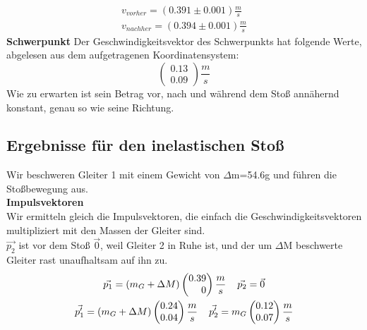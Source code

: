 \documentclass{article}
\begin{document}
\begin{gather*}
v_{vorher}=(0.391 \pm 0.001) \frac{m}{s} \\
v_{nachher}=( 0.394 \pm 0.001) \frac{m}{s}
\end{gather*}
\textbf{Schwerpunkt}
Der Geschwindigkeitsvektor des Schwerpunkts hat folgende Werte, abgelesen aus dem aufgetragenen Koordinatensystem: 
\begin{equation}
\begin{pmatrix*}
0.13 \\ 0.09 
\end{pmatrix*}\frac{m}{s} 
\end{equation}
Wie zu erwarten ist sein Betrag vor, nach und während dem Stoß annähernd konstant, genau so wie seine Richtung.
\subsection{Ergebnisse für den inelastischen Stoß}
Wir beschweren Gleiter 1 mit einem Gewicht von $\Delta$m=54.6g und führen die Stoßbewegung aus. \\
\textbf{Impulsvektoren}\\
Wir ermitteln gleich die Impulsvektoren, die einfach die Geschwindigkeitsvektoren multipliziert mit den Massen der Gleiter sind. \\
$\vec{p_2}$ ist vor dem Stoß $\vec{0}$, weil Gleiter 2 in Ruhe ist, und der um $\Delta$M beschwerte Gleiter rast unaufhaltsam auf ihn zu.
\begin{gather*}
\vec{p_1}=(m_G+\Delta M)
\begin{pmatrix*}[r]
0.39 \\ 0
\end{pmatrix*}\frac{m}{s} \hspace{0.4cm}
\vec{p_2}=\vec{0} \\
\vec{p_1'}=
(m_G+\Delta M)\begin{pmatrix*}[r]
0.24 \\ 0.04
\end{pmatrix*} \frac{m}{s}\hspace{0.4cm}
\vec{p_2'}=m_G\begin{pmatrix*}[r]
0.12 \\ 0.07
\end{pmatrix*} \frac{m}{s}
\end{gather*}
\end{document}
